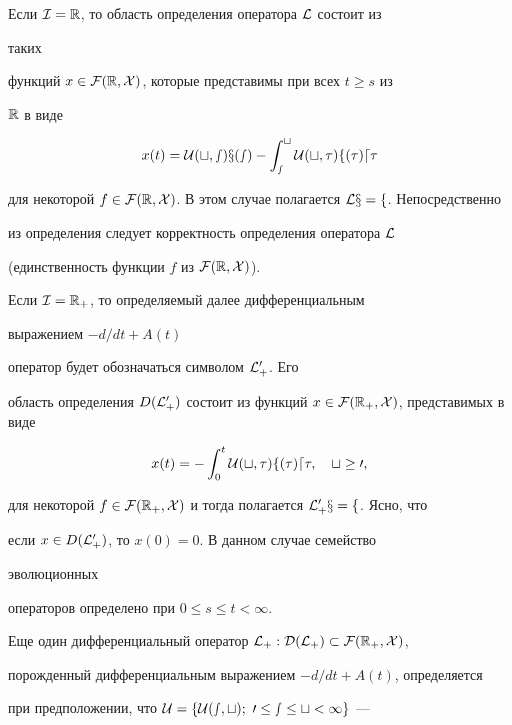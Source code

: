  


Если $\cal I=\Bbb R$, то область определения оператора $\cal L$ состоит из 


таких 


функций $x\in\cal F(\Bbb R,X)$, которые представимы при всех $t\ge s$ из 


$\Bbb R$ в виде 


$$ 


x(t)=\cal U(t,s)x(s)-\int^t_s\cal U(t,\tau)f(\tau)d\tau 


$$ 


для некоторой $f\in\cal F(\Bbb R,X)$. В этом случае полагается $\cal L 


x=f$. Непосредственно 


из определения следует корректность определения оператора $\cal L$ 


(единственность функции $f$ из $\cal F(\Bbb R,X)$). 


 


Если $\cal I=\Bbb R_+$, то определяемый далее дифференциальным 


выражением $-d/d t+A(t)$ 


оператор будет обозначаться символом $\cal L^0_+$. Его 


область определения $D(\cal L^0_+)$ состоит из функций $x\in\cal F(\Bbb 


R_+,X)$, представимых в виде 


$$ 


x(t)=-\int^t_0\cal U(t,\tau)f(\tau)d\tau,\quad t\ge0, 


$$ 


для некоторой $f\in\cal F(\Bbb R_+,X)$ и тогда полагается $\cal 


L^0_+x=f$. Ясно, что 


если $x\in D(\cal L^0_+)$, то $x(0)=0$. В данном случае семейство 


эволюционных 


операторов определено при $0\le s\le t<\infty$. 


 


Еще один дифференциальный оператор $\cal L_+:D(\cal L_+)\subset\cal 


F(\Bbb R_+,X)$, 


порожденный дифференциальным выражением $-d/d t+A(t)$, определяется 


при предположении, что $\cal U=\{\cal U(s,t);\ 0\le s\le t<\infty\}$ --- 


